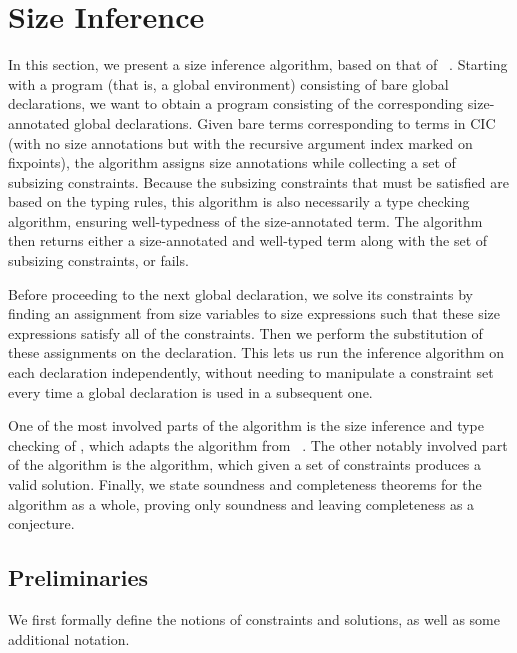 \section{Size Inference}\label{sec:algorithm}

In this section, we present a size inference algorithm, based on that of \CIChat~\citep{cic-hat}.
Starting with a program (that is, a global environment) consisting of bare global declarations,
we want to obtain a program consisting of the corresponding size-annotated global declarations.
Given bare terms corresponding to terms in CIC
(with no size annotations but with the recursive argument index marked on fixpoints),
the algorithm assigns size annotations while collecting a set of subsizing constraints.
Because the subsizing constraints that must be satisfied are based on the typing rules,
this algorithm is also necessarily a type checking algorithm,
ensuring well-typedness of the size-annotated term.
The algorithm then returns either a size-annotated and well-typed term along with the set of subsizing constraints, or fails.

Before proceeding to the next global declaration,
we solve its constraints by finding an assignment from size variables to size expressions
such that these size expressions satisfy all of the constraints.
Then we perform the substitution of these assignments on the declaration.
This lets us run the inference algorithm on each declaration independently,
without needing to manipulate a constraint set every time a global declaration is used in a subsequent one.

One of the most involved parts of the algorithm is the size inference and type checking of \cofixpoints,
which adapts the \RecCheck algorithm from \Fhat~\citep{f-hat}.
The other notably involved part of the algorithm is the \solve algorithm,
which given a set of constraints produces a valid solution.
Finally, we state soundness and completeness theorems for the algorithm as a whole,
proving only soundness and leaving completeness as a conjecture.

\subsection{Preliminaries}

We first formally define the notions of constraints and solutions,
as well as some additional notation.

